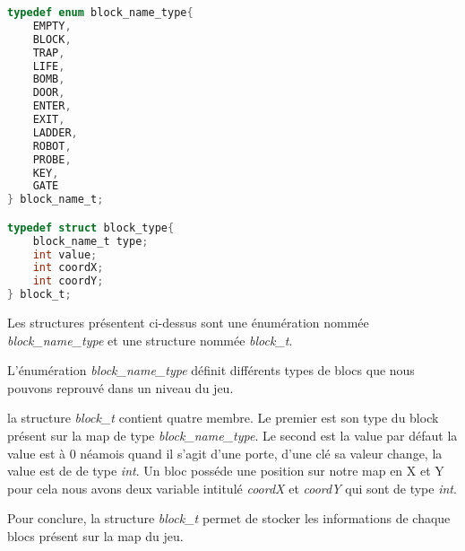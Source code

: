 

\lstset{style=mystyle}
\begin{lstlisting}[language=C, caption=Structure d'uun Block]
typedef enum block_name_type{
    EMPTY,
    BLOCK,
    TRAP,
    LIFE,
    BOMB,
    DOOR,
    ENTER,
    EXIT,
    LADDER,
    ROBOT,
    PROBE,
    KEY,
    GATE
} block_name_t;

typedef struct block_type{
    block_name_t type;
    int value;
    int coordX;
    int coordY;
} block_t;
\end{lstlisting}

Les structures présentent ci-dessus sont une énumération nommée \textit{block\_name\_type} et une structure nommée \textit{block\_t}.

L'énumération \textit{block\_name\_type} définit différents types de blocs que nous pouvons reprouvé dans un niveau du jeu.

la structure \textit{block\_t} contient quatre membre. Le premier est son type du block présent sur la map de type \textit{block\_name\_type}. Le second est la value par défaut la value est à 0 néamois quand il s'agit d'une porte, d'une clé sa valeur change, la value est de de type \textit{int}. Un bloc posséde une position sur notre map en X et Y pour cela nous avons deux variable intitulé \textit{coordX} et \textit{coordY} qui sont de type \textit{int}.

Pour conclure, la structure \textit{block\_t} permet de stocker les informations de chaque blocs présent sur la map du jeu. 

\newpage